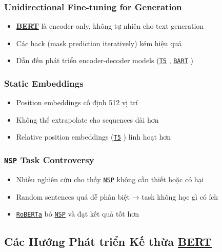 \subsubsection{Unidirectional Fine-tuning for Generation}
\begin{itemize}
    \item \hyperref[acro:bert]{\textbf{BERT}} là encoder-only, không tự nhiên cho text generation
    \item Các hack (mask prediction iteratively) kém hiệu quả
    \item Dẫn đến phát triển encoder-decoder models (\hyperref[acro:t5]{\texttt{T5}} \cite{raffel2020exploring}, \hyperref[acro:bart]{\texttt{BART}} \cite{lewis2019bart})
\end{itemize}

\subsubsection{Static Embeddings}
\begin{itemize}
    \item Position embeddings cố định 512 vị trí
    \item Không thể extrapolate cho sequences dài hơn
    \item Relative position embeddings (\hyperref[acro:t5]{\texttt{T5}} \cite{raffel2020exploring}) linh hoạt hơn
\end{itemize}

\subsubsection{\hyperref[acro:nsp]{\texttt{NSP}} Task Controversy}
\begin{itemize}
    \item Nhiều nghiên cứu cho thấy \hyperref[acro:nsp]{\texttt{NSP}} không cần thiết hoặc có hại \cite{liu2019roberta}
    \item Random sentences quá dễ phân biệt → task không học gì có ích
    \item \hyperref[acro:roberta]{\texttt{RoBERTa}} \cite{liu2019roberta} bỏ \hyperref[acro:nsp]{\texttt{NSP}} và đạt kết quả tốt hơn
\end{itemize}

\subsection{Các Hướng Phát triển Kế thừa \hyperref[acro:bert]{\textbf{BERT}}}
\label{ssec:huong_phat_trien_ke_thua}

